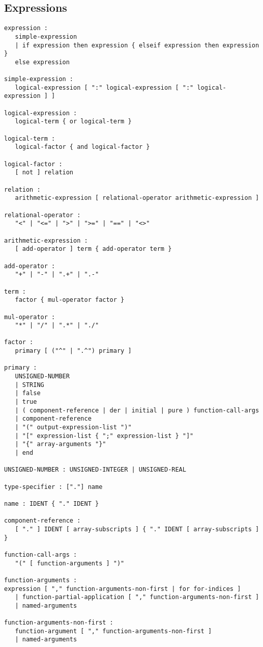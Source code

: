 \subsection{Expressions}
\begin{lstlisting}[language=grammar]
expression :
   simple-expression
   | if expression then expression { elseif expression then expression }
   else expression

simple-expression :
   logical-expression [ ":" logical-expression [ ":" logical-expression ] ]

logical-expression :
   logical-term { or logical-term }

logical-term :
   logical-factor { and logical-factor }

logical-factor :
   [ not ] relation

relation :
   arithmetic-expression [ relational-operator arithmetic-expression ]

relational-operator :
   "<" | "<=" | ">" | ">=" | "==" | "<>"

arithmetic-expression :
   [ add-operator ] term { add-operator term }

add-operator :
   "+" | "-" | ".+" | ".-"

term :
   factor { mul-operator factor }

mul-operator :
   "*" | "/" | ".*" | "./"

factor :
   primary [ ("^" | ".^") primary ]

primary :
   UNSIGNED-NUMBER
   | STRING
   | false
   | true
   | ( component-reference | der | initial | pure ) function-call-args
   | component-reference
   | "(" output-expression-list ")"
   | "[" expression-list { ";" expression-list } "]"
   | "{" array-arguments "}"
   | end

UNSIGNED-NUMBER : UNSIGNED-INTEGER | UNSIGNED-REAL

type-specifier : ["."] name

name : IDENT { "." IDENT }

component-reference :
   [ "." ] IDENT [ array-subscripts ] { "." IDENT [ array-subscripts ] }

function-call-args :
   "(" [ function-arguments ] ")"

function-arguments :
expression [ "," function-arguments-non-first | for for-indices ]
   | function-partial-application [ "," function-arguments-non-first ]
   | named-arguments

function-arguments-non-first :
   function-argument [ "," function-arguments-non-first ]
   | named-arguments


\end{lstlisting}
